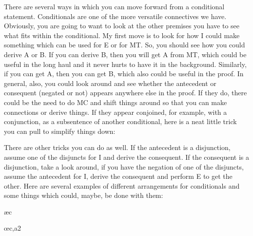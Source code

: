 There are several ways in which you can move forward from a conditional statement. Conditionals are one of the more versatile connectives we have. Obviously, you are going to want to look at the other premises you have to see what fits within the conditional. My first move is to look for how I could make something which can be used for \eif E or for MT. So, you should see how you could derive A or \enot B. If you can derive \enot B, then you will get \enot A from MT, which could be useful in the long haul and it never hurts to have it in the background. Similarly, if you can get A, then you can get B, which also could be useful in the proof. In general, also, you could look around and see whether the antecedent or consequent (negated or not) appears anywhere else in the proof. If they do, there could be the need to do MC and shift things around so that you can make connections or derive things. If they appear conjoined, for example, with a conjunction, as a subsentence of another conditional, here is a neat little trick you can pull to simplify things down:
\begin{fitchproof}
\open
{}
\close
{}
\end{fitchproof}

There are other tricks you can do as well. If the antecedent is a disjunction, assume one of the disjuncts for \eif I and derive the consequent. If the consequent is a disjunction, take a look around, if you have the negation of one of the disjuncts, assume the antecedent for \eif I, derive the consequent and perform \eor E to get the other. Here are several examples of different arrangements for conditionals and some things which could, maybe, be done with them:
\begin{fitchproof}
\open
{}
\ae{c}
\close
{}
\end{fitchproof}

\begin{fitchproof}
\open
{}
\oe{c,a2}
\close
{}
\end{fitchproof}
